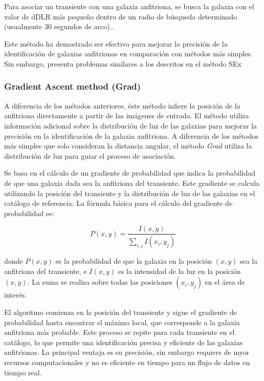 \documentclass[../tesis.tex]{subfiles}
\begin{document}
Para asociar un transiente con una galaxia anfitriona, se busca la galaxia con el valor de \(\text{dDLR}\) más pequeño dentro de un radio de búsqueda determinado (usualmente 30 segundos de arco)..\par\null\par 

Este método ha demostrado ser efectivo para mejorar la precisión de la identificación de galaxias anfitrionas en comparación con métodos más simples. Sin embargo, presenta problemas similares a los descritos en el método SEx\par\null\par

\subsubsection{Gradient Ascent method (Grad)}
A diferencia de los métodos anteriores, éste método infiere la posición de la anfitriona directamente a partir de las imágenes de entrada. El método utiliza información adicional sobre la distribución de luz de las galaxias para mejorar la precisión en la identificación de la galaxia anfitriona. A diferencia de los métodos más simples que solo consideran la distancia angular, el método \textit{Grad} utiliza la distribución de luz para guiar el proceso de asociación.\par\null\par

Se basa en el cálculo de un gradiente de probabilidad que indica la probabilidad de que una galaxia dada sea la anfitriona del transiente. Este gradiente se calcula utilizando la posición del transiente y la distribución de luz de las galaxias en el catálogo de referencia. La fórmula básica para el cálculo del gradiente de probabilidad es:

\[
P(x, y) = \frac{I(x, y)}{\sum_{i,j} I(x_i, y_j)}
\]

donde \(P(x, y)\) es la probabilidad de que la galaxia en la posición \((x, y)\) sea la anfitriona del transiente, e \(I(x, y)\) es la intensidad de la luz en la posición \((x, y)\). La suma se realiza sobre todas las posiciones \((x_i, y_j)\) en el área de interés.\par\null\par

El algoritmo comienza en la posición del transiente y sigue el gradiente de probabilidad hasta encontrar el máximo local, que corresponde a la galaxia anfitriona más probable. Este proceso se repite para cada transiente en el catálogo, lo que permite una identificación precisa y eficiente de las galaxias anfitrionas. La principal ventaja es su precisión, sin embargo requiere de myor recursos computacionales y no es eficiente en tiempo para un flujo de datos en tiempo real.\par\null\par
\end{document}
